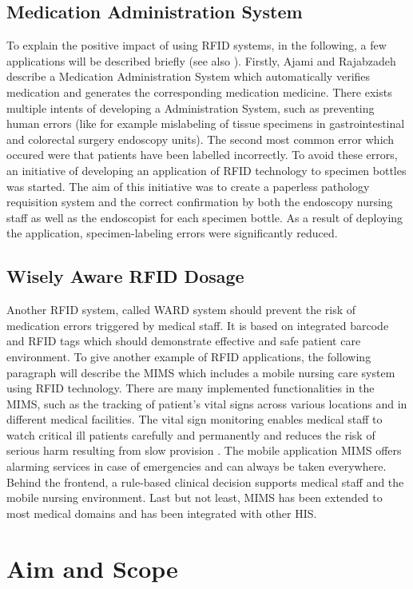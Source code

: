 \subsection{Medication Administration System}
To explain the positive impact of using RFID systems, in the following, a few applications will be described briefly (see also \cite{ncbi}). Firstly, Ajami and Rajabzadeh describe a Medication Administration System which automatically verifies medication and generates the corresponding medication medicine. There exists multiple intents of developing a Administration System, such as preventing human errors (like for example mislabeling of tissue specimens in gastrointestinal and colorectal surgery endoscopy units). The second most common error which occured were that patients have been labelled incorrectly. To avoid these errors, an initiative of developing an application of RFID technology to specimen bottles was started. The aim of this initiative was to create a paperless pathology requisition system and the correct confirmation by both the endoscopy nursing staff as well as the endoscopist for each specimen bottle. As a result of deploying the application, specimen-labeling errors were significantly reduced.

\subsection{Wisely Aware RFID Dosage}
Another RFID system, called \ac{WARD} system should prevent the risk of medication errors triggered by medical staff. It is based on integrated barcode and RFID tags which should demonstrate effective and safe patient care environment. 
To give another example of RFID applications, the following paragraph will describe the \ac{MIMS} which includes a mobile nursing care system using RFID technology. There are many implemented functionalities in the MIMS, such as the tracking of patient's vital signs across various locations and in different medical facilities. The vital sign monitoring enables medical staff to watch critical ill patients carefully and permanently and reduces the risk of serious harm resulting from slow provision \cite{ncbi}. The mobile application MIMS offers alarming services in case of emergencies and can always be taken everywhere. Behind the frontend, a rule-based clinical decision supports medical staff and the mobile nursing environment. Last but not least, MIMS has been extended to most medical domains and has been integrated with other HIS.

\section{Aim and Scope}

